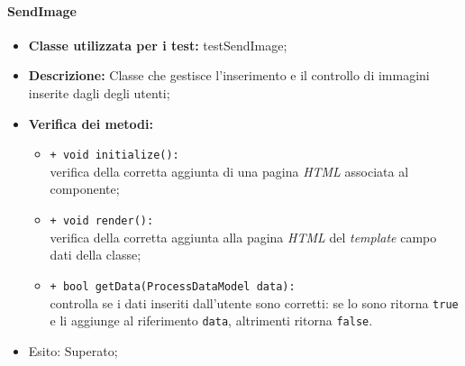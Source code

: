 \paragraph{SendImage}
\begin{flushleft}
\begin{itemize}
\item \textbf{Classe utilizzata per i test:} testSendImage;
\item \textbf{Descrizione:} Classe che gestisce l'inserimento e il controllo di immagini inserite dagli degli utenti;
\item \textbf{Verifica dei metodi:}
\begin{sloppypar}
\begin{itemize}
\item \texttt{+ void initialize():}\\ verifica della corretta aggiunta di una pagina \textit{HTML} associata al componente;
\item \texttt{+ void render():}\\ verifica della corretta aggiunta alla pagina \textit{HTML} del \textit{template} campo dati della classe;
\item \texttt{+ bool getData(ProcessDataModel data):}\\ controlla se i dati inseriti dall'utente sono corretti: se lo sono ritorna \texttt{true} e li aggiunge al riferimento \texttt{data}, altrimenti ritorna \texttt{false}.
\end{itemize}
\end{sloppypar}
\item Esito: Superato;
\end{itemize}
\end{flushleft}

